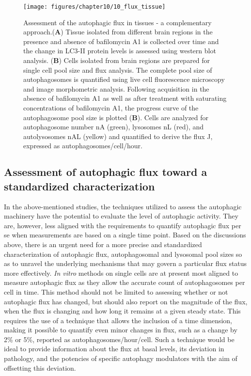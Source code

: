 \begin{figure}[!htbp]
  \texttt{[image: figures/chapter10/10\_flux\_tissue]}
  \caption[Assessment of the autophagic flux in tissues.]{Assessment of the autophagic flux in tissues - a complementary approach.(\textbf{A}) Tissue isolated from different brain regions in the presence and absence of bafilomycin A1 is collected over time and the change in LC3-II protein levels is assessed using western blot analysis. (\textbf{B}) Cells isolated from brain regions are prepared for single cell pool size and flux analysis. The complete pool size of autophagosomes is quantified using live cell fluorescence microscopy and image morphometric analysis. Following acquisition in the absence of bafilomycin A1 as well as after treatment with saturating concentrations of bafilomycin A1, the progress curve of the autophagosome pool size is plotted (\textbf{B}). Cells are analyzed for autophagosome number nA (green), lysosomes nL (red), and autolysosomes nAL (yellow) and quantified to derive the flux J, expressed as autophagosomes/cell/hour.}
  \label{fig:10_flux_tissue}
\end{figure}

\subsection{Assessment of autophagic flux  toward a standardized characterization}
In the above-mentioned studies, the techniques utilized to assess the autophagic machinery have the potential to evaluate the level of autophagic activity. They are, however, less aligned with the requirements to quantify autophagic flux per se when measurements are based on a single time point. Based on the discussions above, there is an urgent need for a more precise and standardized characterization of autophagic flux, autophagosomal and lysosomal pool sizes so as to unravel the underlying mechanisms that may govern a particular flux status more effectively. \textit{In vitro} methods on single cells are at present most aligned to measure autophagic flux as they allow the accurate count of autophagosomes per cell in time. This method should not be limited to assessing whether or not autophagic flux has changed, but should also report on the magnitude of the flux, when the flux is changing and how long it remains at a given steady state. This requires the use of a technique that allows the inclusion of a time dimension, making it possible to quantify even minor changes in flux, such as a change by 2\% or 5\%, reported as autophagosomes/hour/cell. Such a technique would be ideal to provide information about the flux at basal levels, its deviation in pathology, and the potencies of specific autophagy modulators with the aim of offsetting this deviation. 

